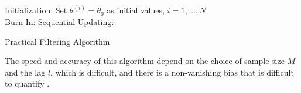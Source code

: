 \begin{algorithm}[h]
\SetAlgoLined 
Initialization: Set $\theta^{(i)}=\theta_0$ as initial values, $i=1,\ldots,N$.  \\
Burn-In: 
Sequential Updating: 
 \caption{Practical Filtering Algorithm}\label{algorithmPraticalFilter}
\end{algorithm}

The speed and accuracy of this algorithm depend on the choice of sample size $M$ and the lag $l$, which is difficult, and there is a non-vanishing bias that is difficult to quantify \citep{polson2008practical, kantas2009overview}.







